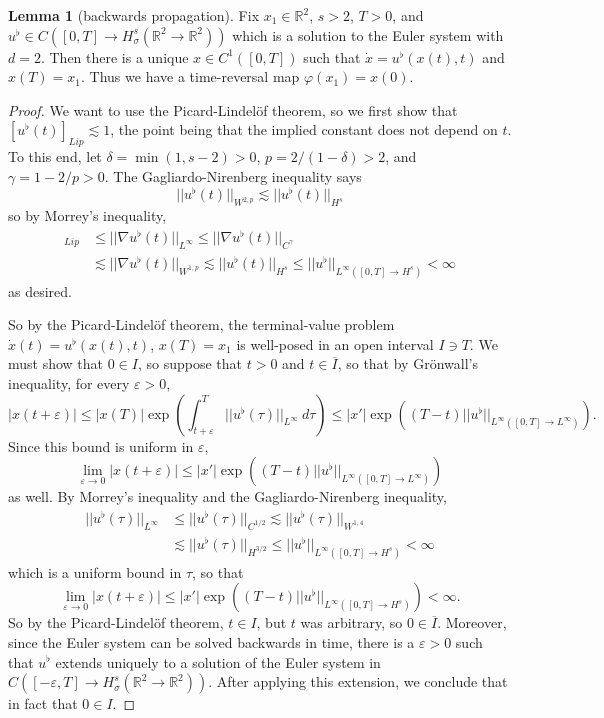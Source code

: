 \documentclass[10pt]{article}
\newcommand{\RR}{\mathbb{R}}
\theoremstyle{definition}
\newtheorem{lemma}{Lemma}[exer]
\begin{document}
\begin{lemma}[backwards propagation]
\label{solving the terminal value problem}
Fix $x_1 \in \RR^2$, $s > 2$, $T > 0$, and $u^\flat \in C([0, T] \to H^s_\sigma(\RR^2 \to \RR^2))$ which is a solution to the Euler system with $d = 2$.
Then there is a unique $x \in C^1([0, T])$ such that $\dot x = u^\flat(x(t), t)$ and $x(T) = x_1$.
Thus we have a time-reversal map $\varphi(x_1) = x(0)$.
\end{lemma}
\begin{proof}
We want to use the Picard-Lindel\"of theorem, so we first show that $[u^\flat(t)]_{Lip} \lesssim 1$, the point being that the implied constant does not depend on $t$.
To this end, let $\delta = \min(1, s - 2) > 0$, $p = 2/(1 - \delta) > 2$, and $\gamma = 1 - 2/p > 0$.
The Gagliardo-Nirenberg inequality says
$$||u^\flat(t)||_{W^{2,p}} \lesssim ||u^\flat(t)||_{H^s}$$
so by Morrey's inequality,
\begin{align*}[u^\flat(t)]_{Lip} &\leq ||\nabla u^\flat(t)||_{L^\infty} \leq ||\nabla u^\flat(t)||_{C^\gamma} \\
&\lesssim ||\nabla u^\flat(t)||_{W^{1,p}} \lesssim ||u^\flat(t)||_{H^s} \leq ||u^\flat||_{L^\infty([0, T] \to H^s)} < \infty
\end{align*}
as desired.

So by the Picard-Lindel\"of theorem, the terminal-value problem $\dot x(t) = u^\flat(x(t), t)$, $x(T) = x_1$ is well-posed in an open interval $I \ni T$.
We must show that $0 \in I$, so suppose that $t > 0$ and $t \in \overline I$, so that by Gr\"onwall's inequality, for every $\varepsilon > 0$,
$$|x(t + \varepsilon)| \leq |x(T)| \exp\left(\int_{t + \varepsilon}^T ||u^\flat(\tau)||_{L^\infty} ~d\tau\right) \leq |x'| \exp ((T - t) ||u^\flat||_{L^\infty([0, T] \to L^\infty)}).$$
Since this bound is uniform in $\varepsilon$,
$$\lim_{\varepsilon \to 0} |x(t + \varepsilon)| \leq |x'| \exp((T - t)||u^\flat||_{L^\infty([0, T] \to L^\infty)})$$
as well.
By Morrey's inequality and the Gagliardo-Nirenberg inequality,
\begin{align*}
||u^\flat(\tau)||_{L^\infty} &\leq ||u^\flat(\tau)||_{C^{1/2}} \lesssim ||u^\flat(\tau)||_{W^{1,4}} \\
&\lesssim ||u^\flat(\tau)||_{H^{3/2}} \leq ||u^\flat||_{L^\infty([0, T] \to H^s)} < \infty
\end{align*}
which is a uniform bound in $\tau$, so that
$$\lim_{\varepsilon \to 0} |x(t + \varepsilon)| \leq |x'|\exp((T - t)||u^\flat||_{L^\infty([0, T] \to H^s)}) < \infty.$$
So by the Picard-Lindel\"of theorem, $t \in I$, but $t$ was arbitrary, so $0 \in \overline I$.
Moreover, since the Euler system can be solved backwards in time, there is a $\varepsilon > 0$ such that $u^\flat$ extends uniquely to a solution of the Euler system in $C([-\varepsilon, T] \to H^s_\sigma(\RR^2 \to \RR^2))$.
After applying this extension, we conclude that in fact that $0 \in I$.
\end{proof}
\end{document}
